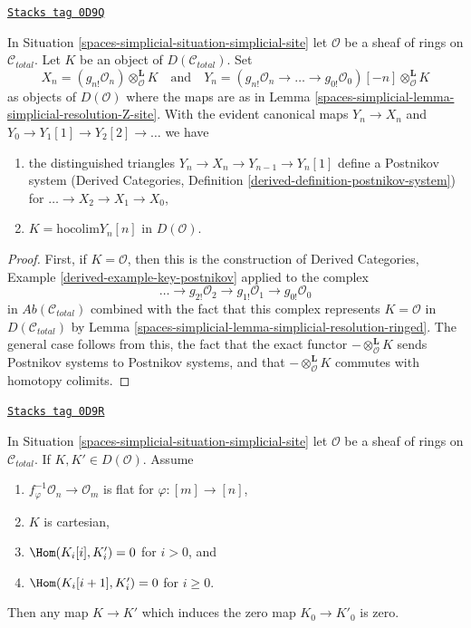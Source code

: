 \begin{lemma}
\label{spaces-simplicial-lemma-modules-postnikov}
\href{https://stacks.math.columbia.edu/tag/0D9Q}{\texttt{Stacks tag 0D9Q}}

In Situation \ref{spaces-simplicial-situation-simplicial-site} let $\mathcal{O}$
be a sheaf of rings on $\mathcal{C}_{total}$. Let $K$ be
an object of $D(\mathcal{C}_{total})$. Set
$$
X_n = (g_{n!}\mathcal{O}_n)
\otimes^\mathbf{L}_\mathcal{O} K
\quad\text{and}\quad
Y_n =
(g_{n!}\mathcal{O}_n \to \ldots \to g_{0!}\mathcal{O}_0)[-n]
\otimes^\mathbf{L}_\mathcal{O} K
$$
as objects of $D(\mathcal{O})$ where the maps are
as in Lemma \ref{spaces-simplicial-lemma-simplicial-resolution-Z-site}.
With the evident canonical maps $Y_n \to X_n$ and
$Y_0 \to Y_1[1] \to Y_2[2] \to \ldots$ we have
\begin{enumerate}
\item the distinguished triangles $Y_n \to X_n \to Y_{n - 1} \to Y_n[1]$
define a Postnikov system
(Derived Categories, Definition \ref{derived-definition-postnikov-system})
for $\ldots \to X_2 \to X_1 \to X_0$,
\item $K = \text{hocolim} Y_n[n]$ in $D(\mathcal{O})$.
\end{enumerate}
\end{lemma}

\begin{proof}
First, if $K = \mathcal{O}$, then this is the construction of
Derived Categories, Example \ref{derived-example-key-postnikov}
applied to the complex
$$
\ldots \to
g_{2!}\mathcal{O}_2 \to
g_{1!}\mathcal{O}_1 \to
g_{0!}\mathcal{O}_0
$$
in $\textit{Ab}(\mathcal{C}_{total})$ combined with the fact that
this complex represents $K = \mathcal{O}$ in $D(\mathcal{C}_{total})$
by Lemma \ref{spaces-simplicial-lemma-simplicial-resolution-ringed}.
The general case follows from this, the fact that the exact functor
$- \otimes^\mathbf{L}_\mathcal{O} K$ sends Postnikov systems to
Postnikov systems, and
that $- \otimes^\mathbf{L}_\mathcal{O} K$ commutes with homotopy colimits.
\end{proof}

\begin{lemma}
\label{spaces-simplicial-lemma-nullity-cartesian-modules-derived}
\href{https://stacks.math.columbia.edu/tag/0D9R}{\texttt{Stacks tag 0D9R}}

In Situation \ref{spaces-simplicial-situation-simplicial-site} let $\mathcal{O}$ be
a sheaf of rings on $\mathcal{C}_{total}$.
If $K, K' \in D(\mathcal{O})$.
Assume
\begin{enumerate}
\item $f_\varphi^{-1}\mathcal{O}_n \to \mathcal{O}_m$ is flat for
$\varphi : [m] \to [n]$,
\item $K$ is cartesian,
\item $\Hom(K_i[i], K'_i) = 0$ for $i > 0$, and
\item $\Hom(K_i[i + 1], K'_i) = 0$ for $i \geq 0$.
\end{enumerate}
Then any map $K \to K'$ which induces the zero map $K_0 \to K'_0$ is zero.
\end{lemma}

